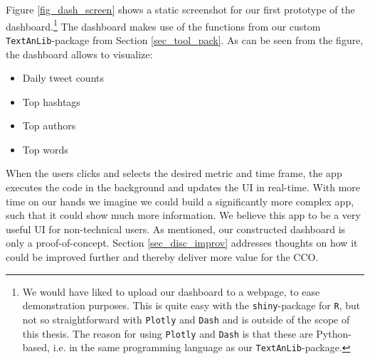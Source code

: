            \newline\indent
        Figure \ref{fig_dash_screen} shows a static screenshot for our first prototype of the dashboard.\footnote{We would have liked to upload our dashboard to a webpage, to ease demonstration purposes. This is quite easy with the \texttt{shiny}-package for \texttt{R}, but not so straightforward with \texttt{Plotly} and \texttt{Dash} and is outside of the scope of this thesis. The reason for using \texttt{Plotly} and \texttt{Dash} is that these are Python-based, i.e. in the same programming language as our \texttt{TextAnLib}-package.} The dashboard makes use of the functions from our custom \texttt{TextAnLib}-package from Section \ref{sec_tool_pack}. As can be seen from the figure, the dashboard allows to visualize:
            \begin{itemize}
                \item 
                Daily tweet counts
                
                \item 
                Top hashtags
                
                \item 
                Top authors
                
                \item 
                Top words
            \end{itemize}
        When the users clicks and selects the desired metric and time frame, the app executes the code in the background and updates the UI in real-time. With more time on our hands we imagine we could build a significantly more complex app, such that it could show much more information. We believe this app to be a very useful UI for non-technical users. As mentioned, our constructed dashboard is only a proof-of-concept. Section \ref{sec_disc_improv} addresses thoughts on how it could be improved further and thereby deliver more value for the CCO.